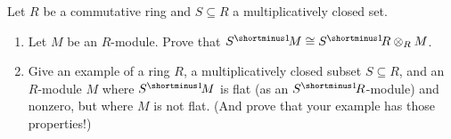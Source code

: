 \begin{question}[subtitle = {January 2019 Problem 3, edited},ID=Jan19_3]
Let $R$ be a commutative ring and $S \subseteq R$ a multiplicatively closed set.
\begin{enumerate}
    \item Let $M$ be an $R$-module. Prove that $S\linv M \cong S\linv R \tensor_R M$.
    \item Give an example of a ring $R$, a multiplicatively closed subset $S \subseteq R$, and an $R$-module $M$ where $S\linv M$ is flat (as an $S\linv R$-module) and nonzero, but where $M$ is not flat. (And prove that your example has those properties!)
\end{enumerate}
\end{question}
